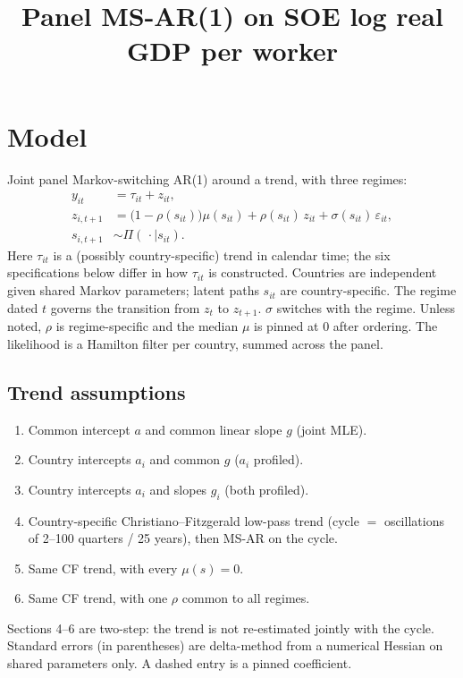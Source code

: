 \documentclass[11pt]{article}
\title{Panel MS-AR(1) on SOE log real GDP per worker}
\author{}
\date{}
\begin{document}
\maketitle
\tableofcontents
\clearpage
\section{Model}
Joint panel Markov-switching AR(1) around a trend, with three regimes:
\begin{align}
y_{it} &= \tau_{it} + z_{it}, \\
z_{i,t+1} &= \bigl(1-\rho(s_{it})\bigr)\mu(s_{it}) + \rho(s_{it})\, z_{it} + \sigma(s_{it})\,\varepsilon_{it}, \\
s_{i,t+1} &\sim \Pi(\,\cdot\mid s_{it}).
\end{align}
Here $\tau_{it}$ is a (possibly country-specific) trend in calendar time; the six specifications below differ in how $\tau_{it}$ is constructed.
Countries are independent given shared Markov parameters; latent paths $s_{it}$ are country-specific. The regime dated $t$ governs the transition from $z_t$ to $z_{t+1}$. $\sigma$ switches with the regime. Unless noted, $\rho$ is regime-specific and the median $\mu$ is pinned at 0 after ordering. The likelihood is a Hamilton filter per country, summed across the panel.
\subsection*{Trend assumptions}
\begin{enumerate}
\item Common intercept $a$ and common linear slope $g$ (joint MLE).
\item Country intercepts $a_i$ and common $g$ ($a_i$ profiled).
\item Country intercepts $a_i$ and slopes $g_i$ (both profiled).
\item Country-specific Christiano--Fitzgerald low-pass trend (cycle $=$ oscillations of 2--100 quarters / 25 years), then MS-AR on the cycle.
\item Same CF trend, with every $\mu(s)=0$.
\item Same CF trend, with one $\rho$ common to all regimes.
\end{enumerate}
Sections 4--6 are two-step: the trend is not re-estimated jointly with the cycle.
Standard errors (in parentheses) are delta-method from a numerical Hessian on shared parameters only. A dashed entry is a pinned coefficient.
\clearpage
\end{document}
